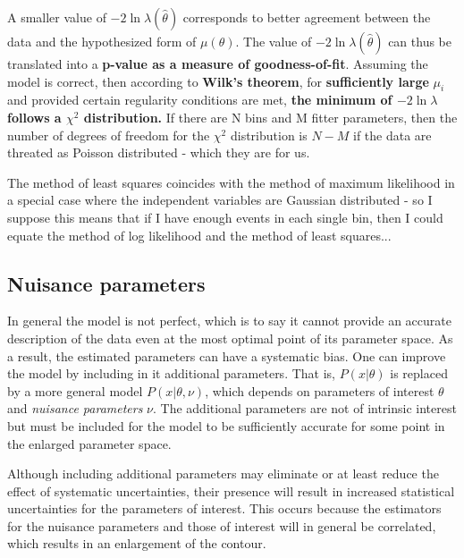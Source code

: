 A smaller value of $-2\ln\lambda\left(\hat{\theta}\right)$ corresponds to better agreement between the data and the hypothesized form of $\mu\left(\theta\right)$. The value of $-2\ln\lambda\left(\hat{\theta}\right)$ can thus be translated into a \textbf{p-value as a measure of goodness-of-fit}. Assuming the model is correct, then according to \textbf{Wilk's theorem}, for \textbf{sufficiently large} $\mu_i$ and provided certain regularity conditions are met, \textbf{the minimum of $-2\ln\lambda$ follows a $\chi^2$ distribution.} If there are N bins and M fitter parameters, then the number of degrees of freedom for the $\chi^2$ distribution is $N-M$ if the data are threated as Poisson distributed - which they are for us.

The method of least squares coincides with the method of maximum likelihood in a special case where the independent variables are Gaussian distributed - so I suppose this means that if I have enough events in each single bin, then I could equate the method of log likelihood and the method of least squares...

\subsection{Nuisance parameters}
In general the model is not perfect, which is to say it cannot provide an accurate description of the data even at the most optimal point of its parameter space. As a result, the estimated parameters can have a systematic bias. One can improve the model by including in it additional parameters. That is, $P\left(x|\theta\right)$ is replaced by a more general model $P\left(x|\theta,\nu\right)$, which depends on parameters of interest $\theta$ and \textit{nuisance parameters} $\nu$. The additional parameters are not of intrinsic interest but must be included for the model to be sufficiently accurate for some point in the enlarged parameter space.

Although including additional parameters may eliminate or at least reduce the effect of systematic uncertainties, their presence will result in increased statistical uncertainties for the parameters of interest. This occurs because the estimators for the nuisance parameters and those of interest will in general be correlated, which results in an enlargement of the contour.

